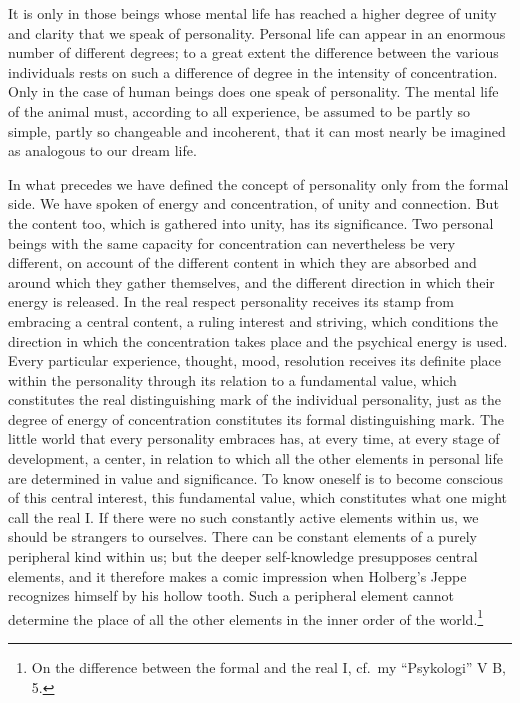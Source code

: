 \documentclass[12pt]{article}
\newcommand{\opage}[1]{\marginnote{\footnotesize\textit{[#1]}}}
\begin{document}
It is only in those beings whose mental life has reached a higher degree of
unity and clarity that we speak of personality. Personal life can appear in an
enormous number of different degrees; to a great extent the difference between
the various individuals rests on such a difference of degree in the intensity
of concentration. Only in the case of human beings does one speak of
personality. The mental life of the animal must, according to all experience,
be assumed to be partly so simple, partly so changeable and incoherent, that it
can most nearly be imagined as analogous to our dream life.

In what precedes we have defined the concept of personality only from the
formal side. We have spoken of energy and concentration, of unity and
connection. But the content too, which is gathered into unity, has its
significance. Two personal beings with the same capacity for concentration can
nevertheless be very different, on account of the different content in which
they are absorbed and around which they gather themselves, and the different
direction in which their energy is released.
\opage{35}%
In the real respect personality receives its stamp from embracing a central
content, a ruling interest and striving, which conditions the direction in which
the concentration takes place and the psychical energy is used. Every particular
experience, thought, mood, resolution receives its definite place within the
personality through its relation to a fundamental value, which constitutes the
real distinguishing mark of the individual personality, just as the degree of
energy of concentration constitutes its formal distinguishing mark. The little
world that every personality embraces has, at every time, at every stage of
development, a center, in relation to which all the other elements in personal
life are determined in value and significance. To know oneself is to become
conscious of this central interest, this fundamental value, which constitutes
what one might call the real I. If there were no such constantly active elements
within us, we should be strangers to ourselves. There can be constant elements
of a purely peripheral kind within us; but the deeper self-knowledge
presupposes central elements, and it therefore makes a comic impression when
Holberg's Jeppe
\opage{36}%
recognizes himself by his hollow tooth. Such a peripheral element cannot
determine the place of all the other elements in the inner order of the
world.\footnote{On the difference between the formal and the real I, cf.\ my
``Psykologi'' V B, 5.}
\end{document}

